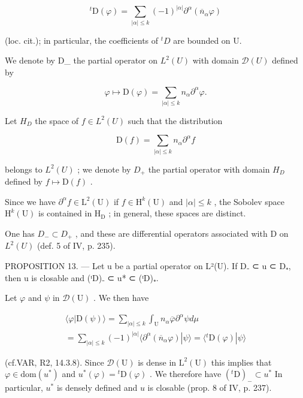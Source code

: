 \[
{ } ^ { t } \mathrm{D} ( \varphi ) = \sum _ { | \alpha | \leqslant k } ( - 1 ) ^ { | \alpha | } \partial ^ { \alpha } ( \overline { { n } } _ { \alpha } \varphi )
\]

(loc. cit.); in particular, the coefficients of \({}^{t}D\) are bounded on U.

We denote by D\_ the partial operator on \(L^{2}(U)\) with domain \(\mathcal{D}(U)\) defined by

\[
\varphi \mapsto \mathrm{D} (\varphi) = \sum_ {| \alpha | \leqslant k} n _ {\alpha} \partial^ {\alpha} \varphi .\tag{5}
\]

Let \(H_{D}\) the space of \(f \in L^{2}(U)\) such that the distribution

\[
\mathrm{D} (f) = \sum_ {| \alpha | \leqslant k} n _ {\alpha} \partial^ {\alpha} f
\]

belongs to \(L^{2}(U)\) ; we denote by \(D_{+}\) the partial operator with domain \(H_{D}\) defined by \(f \mapsto \mathrm{D}(f)\) .

Since we have \(\partial^{\alpha}f\in \mathrm{L}^{2}(\mathrm{U})\) if \(f\in \mathrm{H}^k (\mathrm{U})\) and \(|\alpha |\leqslant k\) , the Sobolev space \(\mathrm{H}^k (\mathrm{U})\) is contained in \(\mathrm{H}_{\mathrm{D}}\) ; in general, these spaces are distinct.

One has \(D_{-} \subset D_{+}\) , and these are differential operators associated with D on \(L^{2}(U)\) (def. 5 of IV, p. 235).

PROPOSITION 13. --- Let u be a partial operator on L²(U). If D₋ ⊂ u ⊂ D₊, then u is closable and (ᵗD)₋ ⊂ u* ⊂ (ᵗD)₊.

Let \(\varphi\) and \(\psi\) in \(\mathcal{D}(\mathrm{U})\) . We then have

\[
\begin{array}{c} \langle \varphi | \mathrm{D} (\psi) \rangle = \sum_ {| \alpha | \leqslant k} \int_ {\mathrm{U}} n _ {\alpha} \overline {{\varphi}} \partial^ {\alpha} \psi d \mu \\ = \sum_ {| \alpha | \leqslant k} (- 1) ^ {| \alpha |} \langle \partial^ {\alpha} (\overline {{n}} _ {\alpha} \varphi) | \psi \rangle = \langle {} ^ {t} \mathrm{D} (\varphi) | \psi \rangle \end{array}
\]

(cf.VAR, R2, 14.3.8). Since \(\mathcal{D}(\mathrm{U})\) is dense in \(\mathrm{L}^2 (\mathrm{U})\) this implies that \(\varphi \in \mathrm{dom}(u^{*})\) and \(u^{*}(\varphi) = {}^{t}\mathrm{D}(\varphi)\) . We therefore have \(({}^{t}\mathrm{D})_{-}\subset u^{*}\) In particular, \(u^{*}\) is densely defined and \(u\) is closable (prop. 8 of IV, p. 237).

